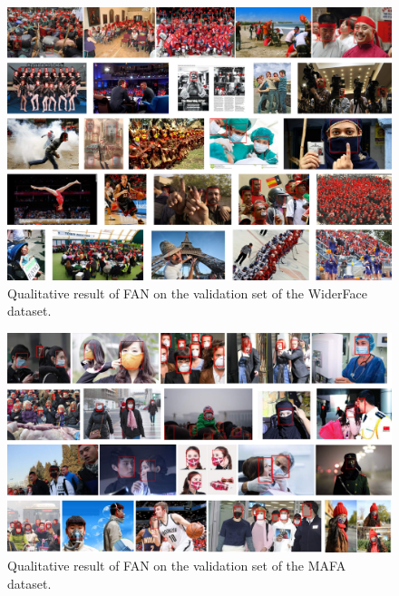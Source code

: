 \documentclass[10pt,twocolumn,letterpaper]{article}
\begin{document}
\begin{figure}[tp]
\begin{center}
    \includegraphics[width=0.9\linewidth]{widerface_vis.pdf}
\end{center} 
    \caption{Qualitative result of FAN on the validation set of the WiderFace dataset.}
\label{fig:widerface_vis}
\end{figure}

\begin{figure}[bp]
\begin{center}
    \includegraphics[width=0.9\linewidth]{mafa_vis.pdf}
\end{center} 
    \caption{Qualitative result of FAN on the validation set of the MAFA dataset.}
\label{fig:mafa_vis}
\end{figure}
\clearpage

{\small


}
\end{document}
